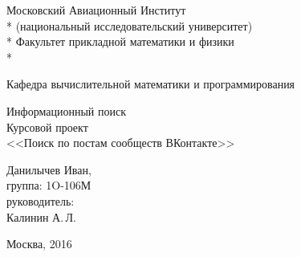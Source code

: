 \begin{titlepage}

\newcommand{\StudentName}{Данилычев Иван}
\newcommand{\Group}{1O-106М}
\newcommand{\CourseName}{Информационный поиск}
\newcommand{\LabNum}{1}
\newcommand{\Subject}{Поиск по постам сообществ ВКонтакте}
\newcommand{\PrepName}{Калинин А.\,Л.}

\newpage

\begin{center}
Московский Авиационный Институт \\*
(национальный исследовательский университет) \\*
Факультет прикладной математики и физики \\*
\hrulefill
\end{center}

\begin{center}
Кафедра вычислительной математики и программирования
\end{center}

\vspace{6em}

\begin{center}
\Large \CourseName \\
	Курсовой проект \\
  <<\Subject>>
\end{center}

\vspace{2em}
\vspace{6em}

\begin{flushright}
	\StudentName, \\
	группа: \Group \\
\vspace{1em}
руководитель:\\
   \PrepName \\
\end{flushright}

\vspace{\fill}

\begin{center}
Москва, 2016
\end{center}

\end{titlepage}
